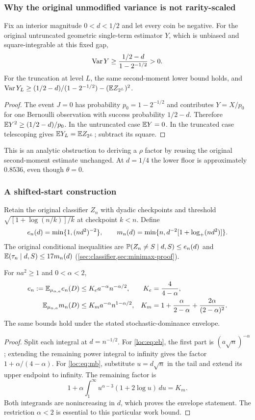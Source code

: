 \subsubsection{Why the original unmodified variance is not rarity-scaled}
\begin{proposition}\label{loc:prop:noise}
Fix an interior magnitude $0<d<1/2$ and let every coin be negative. For the original untruncated geometric single-term estimator $Y$, which is unbiased and square-integrable at this fixed gap,
\[
 \operatorname{Var} Y\ge\frac{1/2-d}{1-2^{-1/2}}>0.
\]
For the truncation at level $L$, the same second-moment lower bound holds, and
$\operatorname{Var} Y_L\ge(1/2-d)/(1-2^{-1/2})-(\mathbb E Z_{2^L})^2$.
\end{proposition}
\begin{proof}
The event $J=0$ has probability $p_0=1-2^{-1/2}$ and contributes $Y=X/p_0$ for one Bernoulli observation with success probability $1/2-d$. Therefore $\mathbb E Y^2\ge(1/2-d)/p_0$. In the untruncated case $\mathbb E Y=0$. In the truncated case telescoping gives $\mathbb E Y_L=\mathbb E Z_{2^L}$; subtract its square.
\end{proof}
This is an analytic obstruction to deriving a $\rho$ factor by reusing the original second-moment estimate unchanged. At $d=1/4$ the lower floor is approximately $0.8536$, even though $\theta=0$.

\subsubsection{A shifted-start construction}
Retain the original classifier $Z_n$ with dyadic checkpoints and threshold
$\sqrt{[1+\log(n/k)]/k}$ at checkpoint $k<n$. Define
\[
 e_n(d)=\min\{1,(nd^2)^{-2}\},\qquad
 m_n(d)=\min\{n,d^{-2}[1+\log_+(nd^2)]\}.
\]
The original conditional inequalities are
$\mathbb P(Z_n\ne S\mid d,S)\le e_n(d)$ and
$\mathbb E(\tau_n\mid d,S)\le17m_n(d)$ (\cref{sec:classifier,sec:minimax-proof}).

\begin{lemma}\label{loc:lem:integrals}
For $na^2\ge1$ and $0<\alpha<2$,
\begin{align}
 e_n:=\mathbb E_{\mu_{\alpha,a}}e_n(D)&\le K_e a^{-\alpha}n^{-\alpha/2},&K_e&=\frac4{4-\alpha},\label{loc:eq:eb}\\
 \mathbb E_{\mu_{\alpha,a}}m_n(D)&\le K_m a^{-\alpha}n^{1-\alpha/2},&
 K_m&=1+\frac\alpha{2-\alpha}+\frac{2\alpha}{(2-\alpha)^2}.\label{loc:eq:mb}
\end{align}
The same bounds hold under the stated stochastic-dominance envelope.
\end{lemma}
\begin{proof}
Split each integral at $d=n^{-1/2}$. For \eqref{loc:eq:eb}, the first part is $(a\sqrt n)^{-\alpha}$; extending the remaining power integral to infinity gives the factor $1+\alpha/(4-\alpha)$. For \eqref{loc:eq:mb}, substitute $u=d\sqrt n$ in the tail and extend its upper endpoint to infinity. The remaining factor is
\[
 1+\alpha\int_1^\infty u^{\alpha-3}(1+2\log u)\,du
 =K_m.
\]
Both integrands are nonincreasing in $d$, which proves the envelope statement. The restriction $\alpha<2$ is essential to this particular work bound.
\end{proof}

